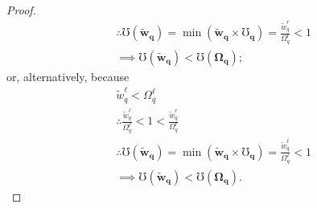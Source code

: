 \documentclass[hidelinks, nonatbib]{elsarticle}
\begin{document}
\begin{lemma}
\begin{proof}
\begin{align}
            &\therefore
            \mho(\boldsymbol{\tilde{w}_q})
            = 
            \min(
                \boldsymbol{\tilde{w}_q}
                \times
                \boldsymbol{\mho_q}
            )
            =
            \frac{
                \tilde{w}_{q}^{r}
            }{
                \Omega_{q}^{r}
            }
            < 
            1
            \\
            &\implies
            \mho(\boldsymbol{\tilde{w}_q})
            <
            \mho(\boldsymbol{\Omega_q})
            ;
        \end{align}
        or, alternatively, because
        \begin{align}
            &
            \tilde{w}_{q}^{\ell} < \Omega_{q}^{\ell}
            \\
            &\therefore
            \frac{
                \tilde{w}_{q}^{\ell}
            }{
                \Omega_{q}^{\ell}
            }
            < 
            1
            < 
            \frac{
                \tilde{w}_{q}^{r}
            }{
                \Omega_{q}^{r}
            }
            \\
            &\therefore
            \mho(\boldsymbol{\tilde{w}_q})
            = 
            \min(
                \boldsymbol{\tilde{w}_q}
                \times
                \boldsymbol{\mho_q}
            )
            =
            \frac{
                \tilde{w}_{q}^{\ell}
            }{
                \Omega_{q}^{\ell}
            }
            < 
            1
            \\
            &\implies
            \mho(\boldsymbol{\tilde{w}_q})
            <
            \mho(\boldsymbol{\Omega_q})
            .
        \end{align}
        

\end{proof}
\end{lemma}
\end{document}
